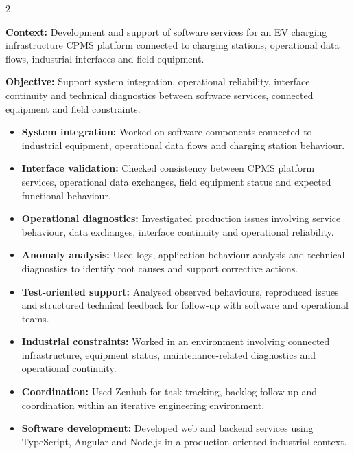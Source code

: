 \documentclass[8pt,a4paper,ragged2e,withhyper]{altacv}
\begin{document}



\makecvheader
\vspace{-0.3cm}


\begin{paracol}{2}



\textbf{Context:} Development and support of software services for an EV charging infrastructure CPMS platform connected to charging stations, operational data flows, industrial interfaces and field equipment.

\textbf{Objective:} Support system integration, operational reliability, interface continuity and technical diagnostics between software services, connected equipment and field constraints.

\begin{itemize}
  \item \textbf{System integration:} Worked on software components connected to industrial equipment, operational data flows and charging station behaviour.
  \item \textbf{Interface validation:} Checked consistency between CPMS platform services, operational data exchanges, field equipment status and expected functional behaviour.
  \item \textbf{Operational diagnostics:} Investigated production issues involving service behaviour, data exchanges, interface continuity and operational reliability.
  \item \textbf{Anomaly analysis:} Used logs, application behaviour analysis and technical diagnostics to identify root causes and support corrective actions.
  \item \textbf{Test-oriented support:} Analysed observed behaviours, reproduced issues and structured technical feedback for follow-up with software and operational teams.
  \item \textbf{Industrial constraints:} Worked in an environment involving connected infrastructure, equipment status, maintenance-related diagnostics and operational continuity.
  \item \textbf{Coordination:} Used Zenhub for task tracking, backlog follow-up and coordination within an iterative engineering environment.
  \item \textbf{Software development:} Developed web and backend services using TypeScript, Angular and Node.js in a production-oriented industrial context.
\end{itemize}


\end{paracol}
\end{document}
